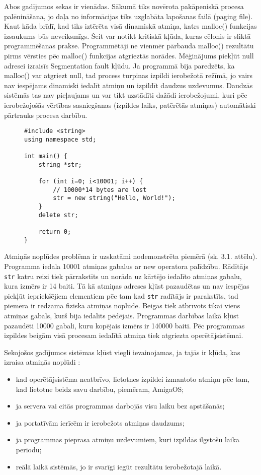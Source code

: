 Abos gadījumos sekas ir vienādas.
Sākumā tiks novērota pakāpeniskā procesa palēnināšana, jo daļa no informācijas tiks uzglabāta lapošanas failā (paging file).
Kaut kāda brīdī, kad tiks iztērēta visā dinamiskā atmiņa, katrs malloc() funkcijas izsaukums būs neveiksmīgs.
Šeit var notikt kritiskā kļūda, kuras cēlonis ir sliktā programmēšanas prakse.
Programmētāji ne vienmēr pārbauda malloc() rezultātu pirms vērsties pēc malloc() funkcijas atgrieztās norādes.  
Mēģinājums piekļūt null adresei  izraisīs Segmentation fault kļūdu.
Ja programmā bija paredzēts, ka malloc() var atgriezt null, tad process turpinas izpildi ierobežotā režīmā, jo vairs nav iespējams dinamiski iedalīt atmiņu un izpildīt daudzus uzdevumus. 
Daudzās sistēmās tas nav pieļaujams un var tikt uzstādīti dažādi ierobežojumi, kuri pēc ierobežojošās vērtības sasniegšanas (izpildes laiks, patērētās atmiņas) automātiski pārtrauks procesa darbību. 

\begin{figure}[h]
\begin{lstlisting}
#include <string>
using namespace std;

int main() {
    string *str;

    for (int i=0; i<10001; i++) {
        // 10000*14 bytes are lost
        str = new string("Hello, World!");
    }
    delete str;

    return 0;
}
\end{lstlisting}
\caption{\textbf{\fontsize{11}{12}\selectfont {Atmiņas noplūde, C++}}}
\end{figure}

Atmiņās noplūdes problēma ir uzskatāmi nodemonstrēta piemērā (sk. 3.1. attēlu).
Programma  iedala 10001 atmiņas gabalus ar new operatora palīdzību. 
Rādītājs \texttt{str} katru reizi tiek pārrakstīts un norāda uz kārtējo iedalīto atmiņas gabalu, kura izmērs ir 14 baiti.
Tā kā atmiņas adreses kļūst pazaudētas un nav iespējas piekļūt iepriekšējiem elementiem pēc tam kad  \texttt{str} radītājs ir parakstīts, tad piemēra ir redzama fiziskā atmiņas noplūde.
Beigās tiek atbrīvots tikai viens atmiņas gabals, kurš bija iedalīts pēdējais. 
Programmas darbības laikā kļūst pazaudēti 10000 gabali, kuru kopējais izmērs ir 140000 baiti.
 Pēc programmas izpildes beigām visā procesam iedalītā atmiņa tiek atgriezta operētājsistēmai.


Sekojošos gadījumos sistēmas kļūst viegli ievainojamas, ja tajās ir kļūda, kas izraisa atmiņās noplūdi \cite{RTTV}: 
\begin{itemize}
\item { kad operētājsistēma neatbrīvo, lietotnes izpildei izmantoto atmiņu pēc tam, kad lietotne beidz savu darbību, piemēram, AmigaOS;}
\item { ja servera vai citās programmas darbojās visu laiku bez apstāšanās; }
\item { ja portatīvām ierīcēm ir ierobežots atmiņas daudzums;}
\item { ja programmas pieprasa atmiņu uzdevumiem, kuri izpildās ilgstošu laika periodu; }
\item { reālā laikā sistēmās, jo ir svarīgi iegūt rezultātu ierobežotajā laikā. }
\end{itemize}


